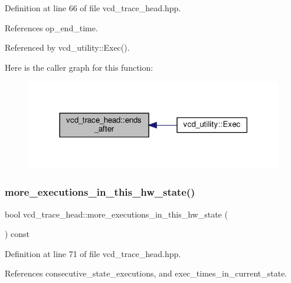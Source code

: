 Definition at line 66 of file vcd\+\_\+trace\+\_\+head.\+hpp.



References op\+\_\+end\+\_\+time.



Referenced by vcd\+\_\+utility\+::\+Exec().

Here is the caller graph for this function\+:
\nopagebreak
\begin{figure}[H]
\begin{center}
\leavevmode
\includegraphics[width=318pt]{df/d30/structvcd__trace__head_a08e6fa00d6e2d694a3297cd536558cb1_icgraph}
\end{center}
\end{figure}
\mbox{\label{structvcd__trace__head_afaca372a204f448329b859a6f1e19b6c}} 
\subsubsection{\texorpdfstring{more\+\_\+executions\+\_\+in\+\_\+this\+\_\+hw\+\_\+state()}{more\_executions\_in\_this\_hw\_state()}}
{\footnotesize\ttfamily bool vcd\+\_\+trace\+\_\+head\+::more\+\_\+executions\+\_\+in\+\_\+this\+\_\+hw\+\_\+state (\begin{DoxyParamCaption}{ }\end{DoxyParamCaption}) const\hspace{0.3cm}{\ttfamily [inline]}}



Definition at line 71 of file vcd\+\_\+trace\+\_\+head.\+hpp.



References consecutive\+\_\+state\+\_\+executions, and exec\+\_\+times\+\_\+in\+\_\+current\+\_\+state.



